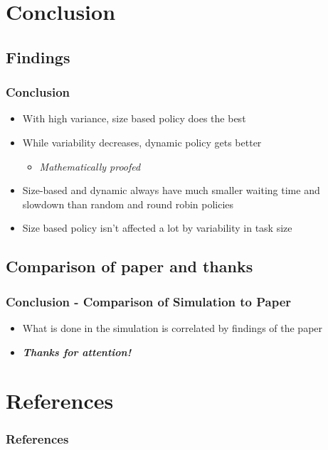 \documentclass[red]{beamer}
\begin{document}
\section{Conclusion}
\subsection{Findings}
\begin{frame}
	\frametitle{Conclusion}

\begin{itemize}
\item With high variance, size based policy does the best
\item While variability decreases, dynamic policy gets better
	\begin{itemize}
	\item \textit{Mathematically proofed}
	\end{itemize}
\item Size-based and dynamic always have much smaller waiting time and slowdown than random and round robin policies
\item Size based policy isn't affected a lot by variability in task size

\end{itemize}
\end{frame}

\subsection{Comparison of paper and thanks}
\begin{frame}
	\frametitle{Conclusion - Comparison of Simulation to Paper}

\begin{itemize}
\item What is done in the simulation is correlated by findings of the paper
\vspace*{2cm}
\item \textbf{\textit{Thanks for attention!}}
\end{itemize}
\end{frame}


\section{References} 
\begin{frame}
	\frametitle{References}
		

	

\end{frame}
\end{document}

